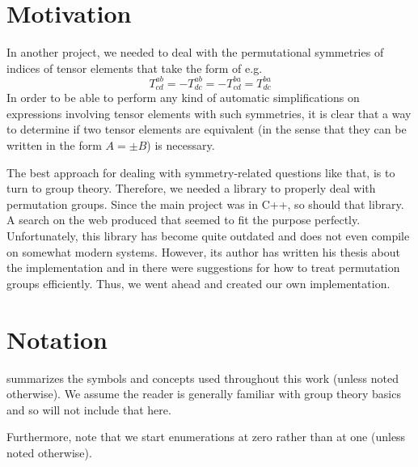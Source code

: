 \documentclass[parskip=half]{scrartcl}
\author{Robert Adam}
\date{last edited: \today}
\title{\libPerm}
\begin{document}
	\maketitle

	\tableofcontents

	\cleardoublepage


	\section{Motivation}

	In another project, we needed to deal with the permutational symmetries of indices of tensor elements that take the form of e.g.
	\begin{equation}
		T^{ab}_{cd} = - T^{ab}_{dc} = -T^{ba}_{cd} = T^{ba}_{dc}
	\end{equation}
	In order to be able to perform any kind of automatic simplifications on expressions involving tensor elements with such symmetries, it is clear
	that a way to determine if two tensor elements are equivalent (in the sense that they can be written in the form $A = \pm B$) is necessary.

	The best approach for dealing with symmetry-related questions like that, is to turn to group theory. Therefore, we needed a library to properly
	deal with permutation groups. Since the main project was in C++, so should that library. A search on the web produced \textcite{PermLib} that
	seemed to fit the purpose perfectly. Unfortunately, this library has become quite outdated and does not even compile on somewhat modern
	systems. However, its author has written his thesis about the implementation\supercite{Rehn2010} and in there were suggestions for how to treat
	permutation groups efficiently. Thus, we went ahead and created our own implementation.


	\section{Notation}

	 summarizes the symbols and concepts used throughout this work (unless noted otherwise). We assume the reader is generally
	familiar with group theory basics and so will not include that here.

	Furthermore, note that we start enumerations at zero rather than at one (unless noted otherwise).
\end{document}
